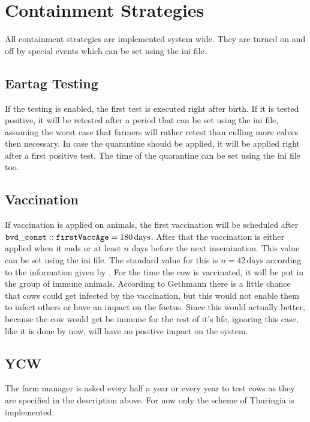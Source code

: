 \section{Containment Strategies}
All containment strategies are implemented system wide. They are turned on and off by special events which can be set using the ini file. 
\subsection{Eartag Testing}
If the testing is enabled, the first test is executed right after birth. If it is tested positive, it will be retested after a period that can be set using the ini file, assuming the worst case that farmers will rather retest than culling more calves then necessary. In case the quarantine should be applied, it will be applied right after a first positive test. The time of the quarantine can be set using the ini file too. 
\subsection{Vaccination}
If vaccination is applied on animals, the first vaccination will be scheduled after ${\tt bvd\_const::firstVaccAge}= 180\,\text{days}$. After that the vaccination is either applied when it ends or at least $n$ days before the next insemination. This value can be set using the ini file. The standard value for this is $n=42\,\text{days}$ according to the information given by \citep{personalCom}. For the time the cow is vaccinated, it will be put in the group of immune animals. According to Gethmann there is a little chance that cows could get infected by the vaccination, but this would not enable them to infect others or have an impact on the foetus. Since this would actually better, because the cow would get be immune for the rest of it's life, ignoring this case, like it is done by now, will have no positive impact on the system.
\subsection{YCW}
The farm manager is asked every half a year or every year to test cows as they are specified in the description above. For now only the scheme of Thuringia is implemented. 
